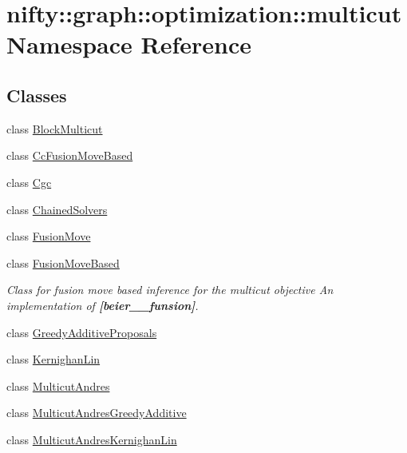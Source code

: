 \hypertarget{namespacenifty_1_1graph_1_1optimization_1_1multicut}{}\section{nifty\+:\+:graph\+:\+:optimization\+:\+:multicut Namespace Reference}
\label{namespacenifty_1_1graph_1_1optimization_1_1multicut}
\subsection*{Classes}
\begin{DoxyCompactItemize}
\item 
class \hyperlink{classnifty_1_1graph_1_1optimization_1_1multicut_1_1BlockMulticut}{Block\+Multicut}
\item 
class \hyperlink{classnifty_1_1graph_1_1optimization_1_1multicut_1_1CcFusionMoveBased}{Cc\+Fusion\+Move\+Based}
\item 
class \hyperlink{classnifty_1_1graph_1_1optimization_1_1multicut_1_1Cgc}{Cgc}
\item 
class \hyperlink{classnifty_1_1graph_1_1optimization_1_1multicut_1_1ChainedSolvers}{Chained\+Solvers}
\item 
class \hyperlink{classnifty_1_1graph_1_1optimization_1_1multicut_1_1FusionMove}{Fusion\+Move}
\item 
class \hyperlink{classnifty_1_1graph_1_1optimization_1_1multicut_1_1FusionMoveBased}{Fusion\+Move\+Based}
\begin{DoxyCompactList}\small\item\em Class for fusion move based inference for the multicut objective An implementation of {\bfseries [beier\+\_\+\_\+funsion]}. \end{DoxyCompactList}\item 
class \hyperlink{classnifty_1_1graph_1_1optimization_1_1multicut_1_1GreedyAdditiveProposals}{Greedy\+Additive\+Proposals}
\item 
class \hyperlink{classnifty_1_1graph_1_1optimization_1_1multicut_1_1KernighanLin}{Kernighan\+Lin}
\item 
class \hyperlink{classnifty_1_1graph_1_1optimization_1_1multicut_1_1MulticutAndres}{Multicut\+Andres}
\item 
class \hyperlink{classnifty_1_1graph_1_1optimization_1_1multicut_1_1MulticutAndresGreedyAdditive}{Multicut\+Andres\+Greedy\+Additive}
\item 
class \hyperlink{classnifty_1_1graph_1_1optimization_1_1multicut_1_1MulticutAndresKernighanLin}{Multicut\+Andres\+Kernighan\+Lin}

\end{DoxyCompactItemize}
